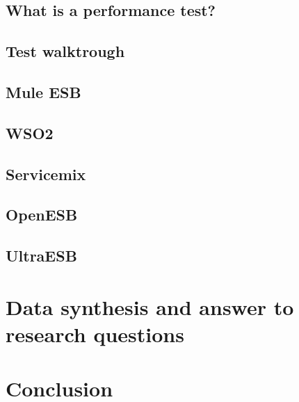 \documentclass{llncs}
\begin{document}
\subsection{What is a performance test?}
\subsection{Test walktrough}
	\subsection{Mule ESB}
	\subsection{WSO2}
	\subsection{Servicemix}
	\subsection{OpenESB}
	\subsection{UltraESB}

\section{Data synthesis and answer to research questions}
\section{Conclusion}



\end{document}
